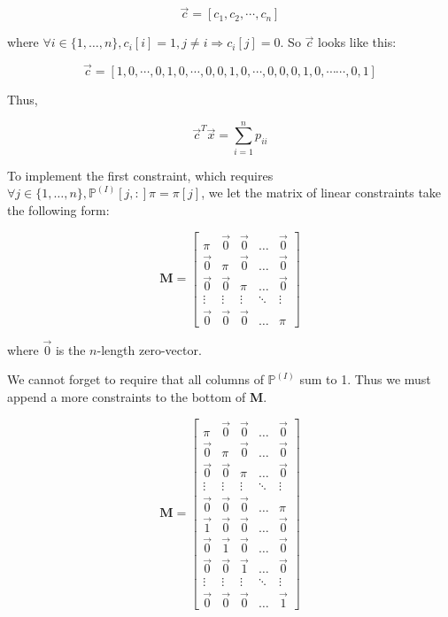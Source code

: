 \documentclass{article}
\begin{document}
\[
\vec{c} = [c_1, c_2, \cdots, c_n]
\]

where $\forall i \in \{1,\dots,n\}, c_i[i] = 1, j \neq i \Rightarrow c_i[j] = 0$. So $\vec{c}$ looks like this:

\[
\vec{c} = [1,0,\cdots,0,1,0,\cdots,0,0,1,0,\cdots,0,0,0,1,0,\cdots\cdots,0,1]
\]

Thus,

\[
\vec{c}^T\vec{x} = \sum_{i=1}^n p_{ii}
\]

To implement the first constraint, which requires $\forall j \in \{1,\dots,n\}, \mathbb{P}^{(I)}[j,:]\pi = \pi[j]$, we let the matrix of linear constraints take the following form:

\[
\textbf{M} = \begin{bmatrix}
    \pi & \vec{0} & \vec{0} & \dots  & \vec{0} \\
    \vec{0} & \pi & \vec{0} & \dots  & \vec{0} \\
    \vec{0} & \vec{0} & \pi & \dots  & \vec{0} \\
    \vdots & \vdots & \vdots & \ddots & \vdots \\
    \vec{0} & \vec{0} & \vec{0} & \dots  & \pi
\end{bmatrix}
\]

where $\vec{0}$ is the $n$-length zero-vector.

We cannot forget to require that all columns of $\mathbb{P}^{(I)}$ sum to 1. Thus we must append a more constraints to the bottom of \textbf{M}.

\[
\textbf{M} = \begin{bmatrix}
    \pi & \vec{0} & \vec{0} & \dots  & \vec{0} \\
    \vec{0} & \pi & \vec{0} & \dots  & \vec{0} \\
    \vec{0} & \vec{0} & \pi & \dots  & \vec{0} \\
    \vdots & \vdots & \vdots & \ddots & \vdots \\
    \vec{0} & \vec{0} & \vec{0} & \dots  & \pi \\
    \vec{1} & \vec{0} & \vec{0} & \dots  & \vec{0} \\
    \vec{0} & \vec{1} & \vec{0} & \dots  & \vec{0} \\
    \vec{0} & \vec{0} & \vec{1} & \dots  & \vec{0} \\
    \vdots & \vdots & \vdots & \ddots & \vdots \\
    \vec{0} & \vec{0} & \vec{0} & \dots  & \vec{1}
\end{bmatrix}
\]
\end{document}
